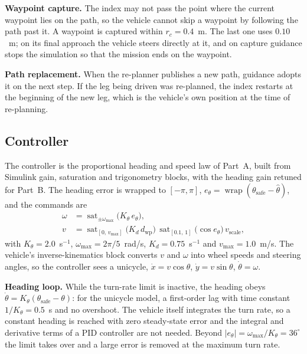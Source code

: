 \textbf{Waypoint capture.} The index may not pass the point where the
current waypoint lies on the path, so the vehicle cannot skip a waypoint
by following the path past it. A waypoint is captured within
$r_{c} = 0.4$~m. The last one uses $0.10$~m; on its final approach the
vehicle steers directly at it, and on capture guidance stops the
simulation so that the mission ends on the waypoint.

\textbf{Path replacement.} When the re-planner publishes a new path,
guidance adopts it on the next step. If the leg being driven was
re-planned, the index restarts at the beginning of the new leg, which
is the vehicle's own position at the time of re-planning.

\subsection{Controller}
\label{sec:controller}
The controller is the proportional heading and speed law of Part~A,
built from Simulink gain, saturation and trigonometry blocks, with the
heading gain retuned for Part~B. The
heading error is wrapped to $[-\pi, \pi]$,
$e_{\theta} = \operatorname{wrap}(\theta_{\text{safe}} - \hat{\theta})$,
and the commands are
\begin{equation}
\begin{aligned}
    \omega &= \operatorname{sat}_{\pm\omega_{\max}}\!\big(K_{\theta}\,e_{\theta}\big), \\
    v &= \operatorname{sat}_{[0,\,v_{\max}]}\!\big(K_{d}\,d_{\text{wp}}\big)\,
         \operatorname{sat}_{[0.1,\,1]}\!\big(\cos e_{\theta}\big)\, v_{\text{scale}},
\end{aligned}
\label{eq:controller}
\end{equation}
with $K_{\theta} = 2.0$~s$^{-1}$, $\omega_{\max} = 2\pi/5$~rad/s,
$K_{d} = 0.75$~s$^{-1}$ and $v_{\max} = 1.0$~m/s. The vehicle's
inverse-kinematics block converts $v$ and $\omega$ into wheel speeds and
steering angles, so the controller sees a unicycle,
$\dot{x} = v\cos\theta$, $\dot{y} = v\sin\theta$, $\dot{\theta} = \omega$.

\textbf{Heading loop.} While the turn-rate limit is inactive, the
heading obeys $\dot{\theta} = K_{\theta}(\theta_{\text{safe}} - \theta)$:
for the unicycle model, a first-order lag with time constant
$1/K_{\theta} = 0.5$~s and no overshoot. The vehicle itself integrates the turn rate, so a constant
heading is reached with zero steady-state error and the integral and
derivative terms of a PID controller are not needed. Beyond
$|e_{\theta}| = \omega_{\max}/K_{\theta} = 36^{\circ}$ the limit takes
over and a large error is removed at the maximum turn rate.

